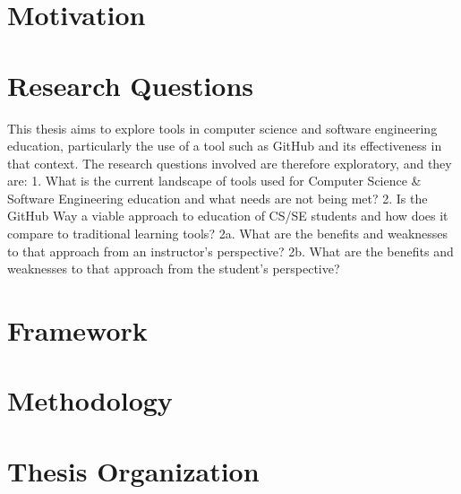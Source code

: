\section{Motivation}

\section{Research Questions}
This thesis aims to explore tools in computer science and software engineering education, particularly the use of a tool such as GitHub and its effectiveness in that context. The research questions involved are therefore exploratory, and they are:
1. What is the current landscape of tools used for Computer Science & Software Engineering education and what needs are not being met?
2. Is the GitHub Way a viable approach to education of CS/SE students and how does it compare to traditional learning tools?
2a. What are the benefits and weaknesses to that approach from an instructor's perspective?
2b. What are the benefits and weaknesses to that approach from the student's perspective?

\section{Framework}

\section{Methodology}


\section{Thesis Organization}








